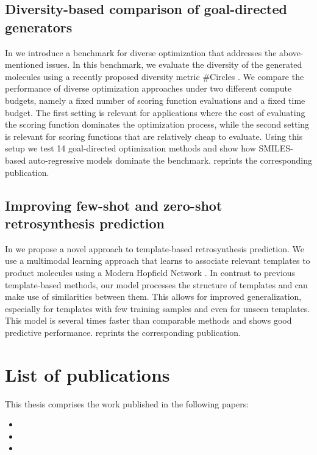 \subsection{Diversity-based comparison of goal-directed generators\label{sec:divopt}} In
\citep{renzDiverseHitsNovo2024} we introduce a benchmark for diverse optimization that addresses the
above-mentioned issues. In this benchmark, we evaluate the diversity of the generated molecules
using a recently proposed diversity metric \#Circles \citep{xieHowMuchSpace2023}. We compare the
performance of diverse optimization approaches under two different compute budgets, namely a fixed
number of scoring function evaluations and a fixed time budget. The first setting is relevant for
applications where the cost of evaluating the scoring function dominates the optimization process,
while the second setting is relevant for scoring functions that are relatively cheap to evaluate.
Using this setup we test 14 goal-directed optimization methods and show how SMILES-based
auto-regressive models dominate the benchmark.  reprints the corresponding
publication.

\subsection{Improving few-shot and zero-shot retrosynthesis prediction}
In \citep{seidlImprovingFewZeroShot2022} we propose a novel approach to template-based
retrosynthesis prediction. We use a multimodal learning approach that learns to associate relevant
templates to product molecules using a Modern Hopfield Network
\citep{ramsauerHopfieldNetworksAll2020}. In contrast to previous template-based methods, our model
processes the structure of templates and can make use of similarities between them. This allows for
improved generalization, especially for templates with few training samples and even for unseen
templates. This model is several times faster than comparable methods and shows good predictive
performance.  reprints the corresponding publication.

\section{List of publications\label{sec:publications}} This thesis comprises the work published in
the following papers:

\begin{itemize}
      \item {}
      \item {}
      \item {}
\end{itemize}

